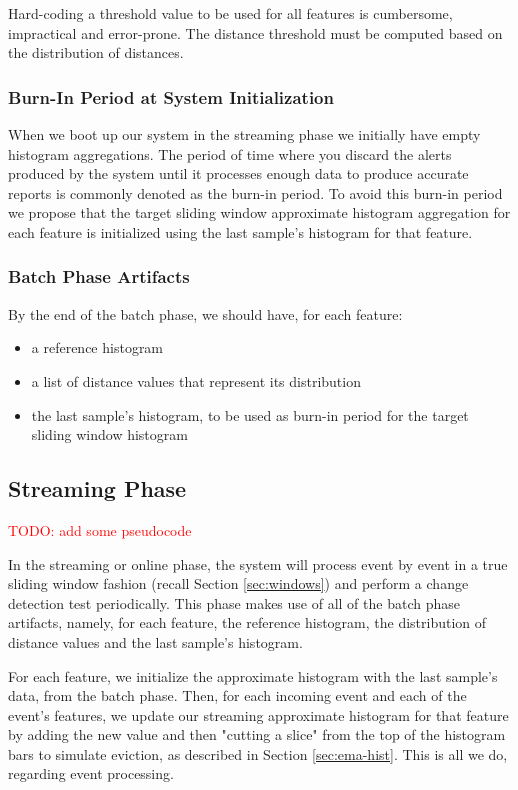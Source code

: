 Hard-coding a threshold value to be used for all features is cumbersome, impractical and error-prone. The distance threshold must be computed based on the distribution of distances.


\subsubsection*{Burn-In Period at System Initialization}
When we boot up our system in the streaming phase we initially have empty histogram aggregations. The period of time where you discard the alerts produced by the system until it processes enough data to produce accurate reports is commonly denoted as the burn-in period. To avoid this burn-in period we propose that the target sliding window approximate histogram aggregation for each feature is initialized using the last sample's histogram for that feature.

\subsubsection*{Batch Phase Artifacts} \label{sec:batch-artifacts-summary}
By the end of the batch phase, we should have, for each feature: 
\begin{itemize}
    \item a reference histogram
    \item a list of distance values that represent its distribution
    \item the last sample's histogram, to be used as burn-in period for the target sliding window histogram
\end{itemize}

\subsection{Streaming Phase} \label{sec:stream-phase}
\textcolor{red}{TODO: add some pseudocode}

In the streaming or online phase, the system will process event by event in a true sliding window fashion (recall Section \ref{sec:windows}) and perform a change detection test periodically. This phase makes use of all of the batch phase artifacts, namely, for each feature, the reference histogram, the distribution of distance values and the last sample's histogram.

For each feature, we initialize the approximate histogram with the last sample's data, from the batch phase. Then, for each incoming event and each of the event's features, we update our streaming approximate histogram for that feature by adding the new value and then "cutting a slice" from the top of the histogram bars to simulate eviction, as described in Section \ref{sec:ema-hist}. This is all we do, regarding event processing.

